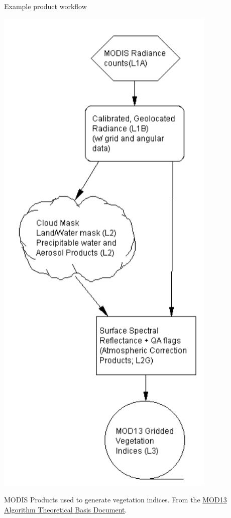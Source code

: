 \documentclass[ignorenonframetext,]{beamer}
\begin{document}
\begin{frame}{Example product workflow}

\includegraphics{assets/VI_flow.png}

MODIS Products used to generate vegetation indices. From the
\href{http://modis.gsfc.nasa.gov/data/atbd/atbd_mod13.pdf}{MOD13
Algorithm Theoretical Basis Document}.

\end{frame}
\end{document}
